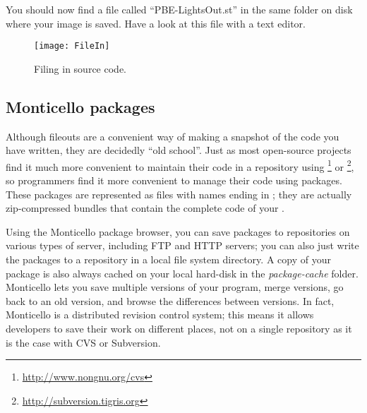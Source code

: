 \documentclass[a4paper,10pt,twoside]{book}
\begin{document}
{
You should now find a file called ``PBE-LightsOut.st'' in the same folder on disk where your image is saved.
Have a look at this file with a text editor.


\begin{figure}[ht]
\centerline {\texttt{[image: FileIn]}}
\caption{Filing in \pharo source code.
}
\end{figure}

\subsection{Monticello packages}
Although fileouts are a convenient way of making a snapshot of the code you have written, they are decidedly ``old school''.
Just as most open-source projects find it much more convenient to maintain their code in a repository using \footnote{\url{http://www.nongnu.org/cvs}} or \footnote{\url{http://subversion.tigris.org}},
so \pharo programmers find it more convenient to manage their code using  packages. 
These packages are represented as files with names ending in ; they are actually zip-compressed bundles that contain the complete code of your .

Using the Monticello package browser, you can save packages to repositories on various types of server, including FTP and HTTP servers; you can also just write the packages to a repository in a local file system directory.
A copy of your package is also always cached on your local hard-disk in the \emph{package-cache} folder. 
Monticello lets you save multiple versions of your program, merge versions, go back to an old version, and browse the differences between versions. 
In fact, Monticello is a distributed revision control system; this means it allows developers to save their work on different places, not on a single repository as it is the case with CVS or Subversion.

}
\end{document}
